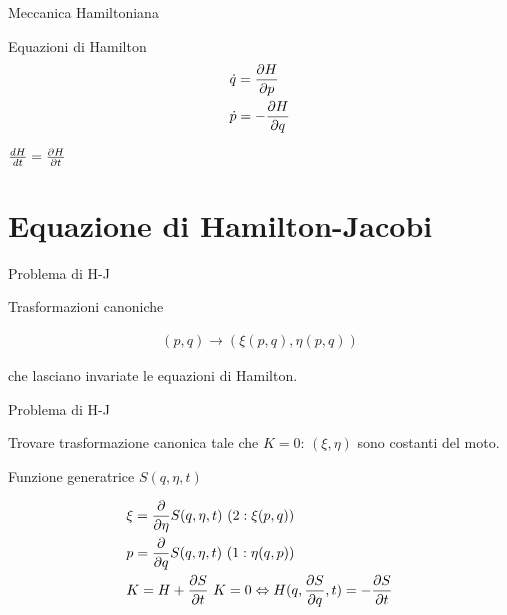 \begin{wordonframe}{Meccanica Hamiltoniana}

\begin{block}{Equazioni di Hamilton}
\begin{align*}
&\dot{q}=\PDy{p}{H}\\
&\dot{p}=-\PDy{q}{H}
\end{align*}
\end{block}

$\TDy{t}{H}=\PDy{t}{H}$

\end{wordonframe}


\section{Equazione di Hamilton-Jacobi}

\begin{frame}{Problema di H-J}

\begin{block}{Trasformazioni canoniche}

\begin{align*}
(p,q)\to(\xi(p,q),\eta(p,q))
\end{align*}

che lasciano invariate le equazioni di Hamilton.

\end{block}

\begin{block}{Problema di H-J}

Trovare trasformazione canonica tale che $K=0$: $(\xi,\eta)$ sono costanti del moto.

\end{block}

\begin{block}{Funzione generatrice $S(q,\eta,t)$}

\begin{align*}
&\xi=\PDof{\eta}S(q,\eta,t)\ (2: \xi(p,q))\\
&p=\PDof{q}S(q,\eta,t)\ (1:\eta(q,p))\\
&K=H+\PDy{t}{S}\ K=0\Leftrightarrow H(q,\PDy{q}{S},t)=-\PDy{t}{S}
\end{align*}

\end{block}

\end{frame}


